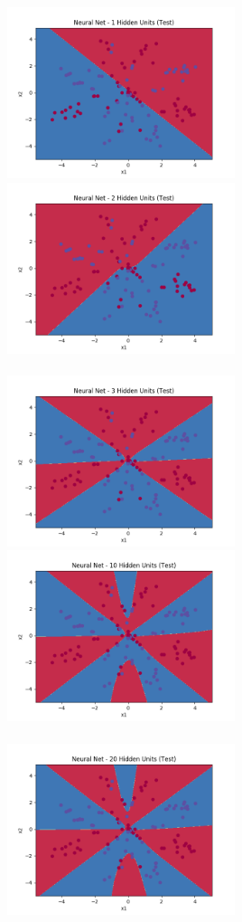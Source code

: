 \documentclass[12pt]{article}
\begin{document}
\begin{addmargin}[0in]{0in}
\includegraphics[width=0.5\textwidth]{nn3.png}
\includegraphics[width=0.5\textwidth]{nn4.png} \\ \\
\includegraphics[width=0.5\textwidth]{nn5.png}
\includegraphics[width=0.5\textwidth]{nn6.png} \\ \\
\includegraphics[width=0.5\textwidth]{nn7.png}

\end{addmargin}
\end{document}
